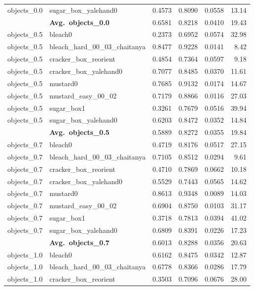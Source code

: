 \begin{longtable}{llrrrr}
  objects_0.0 & sugar\_box\_yalehand0 & 0.4573 & 0.8090 & 0.0558 & 13.14 \\
  \cmidrule{2-6}
  & \textbf{Avg.~objects_0.0} & 0.6581 & 0.8218 & 0.0410 & 19.43 \\
  \midrule
  objects_0.5 & bleach0 & 0.2373 & 0.6952 & 0.0574 & 32.98 \\
  objects_0.5 & bleach\_hard\_00\_03\_chaitanya & 0.8477 & 0.9228 & 0.0141 & 8.42 \\
  objects_0.5 & cracker\_box\_reorient & 0.4854 & 0.7364 & 0.0597 & 9.18 \\
  objects_0.5 & cracker\_box\_yalehand0 & 0.7077 & 0.8485 & 0.0370 & 11.61 \\
  objects_0.5 & mustard0 & 0.7685 & 0.9132 & 0.0174 & 14.67 \\
  objects_0.5 & mustard\_easy\_00\_02 & 0.7179 & 0.8866 & 0.0116 & 27.03 \\
  objects_0.5 & sugar\_box1 & 0.3261 & 0.7679 & 0.0516 & 39.94 \\
  objects_0.5 & sugar\_box\_yalehand0 & 0.6203 & 0.8472 & 0.0352 & 14.84 \\
  \cmidrule{2-6}
  & \textbf{Avg.~objects_0.5} & 0.5889 & 0.8272 & 0.0355 & 19.84 \\
  \midrule
  objects_0.7 & bleach0 & 0.4719 & 0.8176 & 0.0517 & 27.15 \\
  objects_0.7 & bleach\_hard\_00\_03\_chaitanya & 0.7105 & 0.8512 & 0.0294 & 9.61 \\
  objects_0.7 & cracker\_box\_reorient & 0.4710 & 0.7869 & 0.0662 & 10.18 \\
  objects_0.7 & cracker\_box\_yalehand0 & 0.5529 & 0.7443 & 0.0565 & 14.62 \\
  objects_0.7 & mustard0 & 0.8613 & 0.9348 & 0.0089 & 14.03 \\
  objects_0.7 & mustard\_easy\_00\_02 & 0.6904 & 0.8750 & 0.0103 & 31.17 \\
  objects_0.7 & sugar\_box1 & 0.3718 & 0.7813 & 0.0394 & 41.02 \\
  objects_0.7 & sugar\_box\_yalehand0 & 0.6809 & 0.8391 & 0.0226 & 17.23 \\
  \cmidrule{2-6}
  & \textbf{Avg.~objects_0.7} & 0.6013 & 0.8288 & 0.0356 & 20.63 \\
  \midrule
  objects_1.0 & bleach0 & 0.6162 & 0.8475 & 0.0342 & 12.87 \\
  objects_1.0 & bleach\_hard\_00\_03\_chaitanya & 0.6778 & 0.8366 & 0.0286 & 17.79 \\
  objects_1.0 & cracker\_box\_reorient & 0.3503 & 0.7096 & 0.0676 & 28.00 \\

\end{longtable}
